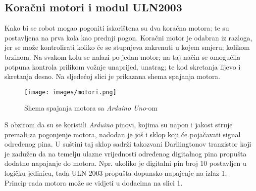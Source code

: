 \subsection{Koračni motori i modul ULN2003}

Kako bi se robot mogao pogoniti iskorištena su dva koračna motora; te su postavljena na prva kola kao prednji pogon. Koračni motor je odabran iz razloga, jer se može kontrolirati koliko će se stupnjeva zakrenuti u kojem smjeru; kolikom brzinom. Na svakom kolu se nalazi po jedan motor; na taj način se omogućila potpuna kontrola prilikom vožnje unaprijed, unatrag; te kod skretanja lijevo i skretanja desno. Na sljedećoj slici je prikazana shema spajanja motora. 

\begin{figure}[h]
    \centering
    \texttt{[image: images/motori.png]}
    \caption{Shema spajanja motora sa \textit{Arduino Uno}-om}
    \label{fig:mesh1}
\end{figure} 

S obzirom da su se koristili \textit{Arduino} pinovi, kojima su napon i jakost struje premali za pogonjenje motora, nadodan je još i sklop koji će pojačavati signal određenog pina. U suštini taj sklop sadrži takozvani Darliingtonov tranzistor koji je zadužen da na temelju ulazne vrijednosti određenog digitalnog pina propušta dodatno napajanje do motora. Npr. ukoliko je digitalni pin broj 10 postavljen u logičku jedinicu, tada ULN 2003 propušta dopunsko napajenje na izlaz 1. \\
Princip rada motora može se vidjeti u dodacima na slici 1.

